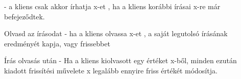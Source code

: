 \documentclass[12pt]{article}
\begin{document}
\begin{description}
                                                                        - a kliens csak akkor írhatja x-et , ha a kliens korábbi írásai x-re már befejeződtek.
                                                                    \item Olvasd az írásodat
                                                                        - ha a kliens olvassa x-et , a saját legutolsó írásának eredményét kapja, vagy frissebbet
                                                                    \item Írás olvasás után
                                                                        - Ha a kliens kiolvasott egy értéket x-ből, minden ezután kiadott frissítési művelete x legalább ennyire friss értékét módosítja.
                                                                \end{description}
                                                                
\end{document}
